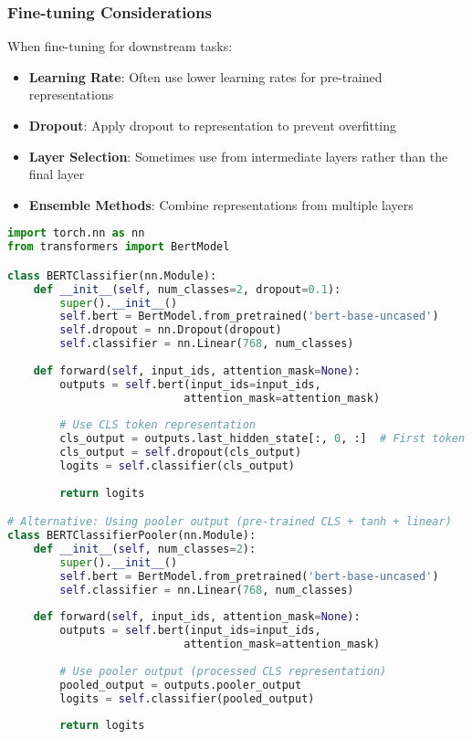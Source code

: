 \subsubsection{Fine-tuning Considerations}
When fine-tuning for downstream tasks:

\begin{itemize}
\item \textbf{Learning Rate}: Often use lower learning rates for pre-trained \cls{} representations
\item \textbf{Dropout}: Apply dropout to \cls{} representation to prevent overfitting
\item \textbf{Layer Selection}: Sometimes use \cls{} from intermediate layers rather than the final layer
\item \textbf{Ensemble Methods}: Combine \cls{} representations from multiple layers
\end{itemize}

\begin{example}
\begin{lstlisting}[language=Python]
import torch.nn as nn
from transformers import BertModel

class BERTClassifier(nn.Module):
    def __init__(self, num_classes=2, dropout=0.1):
        super().__init__()
        self.bert = BertModel.from_pretrained('bert-base-uncased')
        self.dropout = nn.Dropout(dropout)
        self.classifier = nn.Linear(768, num_classes)
        
    def forward(self, input_ids, attention_mask=None):
        outputs = self.bert(input_ids=input_ids, 
                           attention_mask=attention_mask)
        
        # Use CLS token representation
        cls_output = outputs.last_hidden_state[:, 0, :]  # First token
        cls_output = self.dropout(cls_output)
        logits = self.classifier(cls_output)
        
        return logits

# Alternative: Using pooler output (pre-trained CLS + tanh + linear)
class BERTClassifierPooler(nn.Module):
    def __init__(self, num_classes=2):
        super().__init__()
        self.bert = BertModel.from_pretrained('bert-base-uncased')
        self.classifier = nn.Linear(768, num_classes)
        
    def forward(self, input_ids, attention_mask=None):
        outputs = self.bert(input_ids=input_ids, 
                           attention_mask=attention_mask)
        
        # Use pooler output (processed CLS representation)
        pooled_output = outputs.pooler_output
        logits = self.classifier(pooled_output)
        
        return logits
\end{lstlisting}
\end{example}

